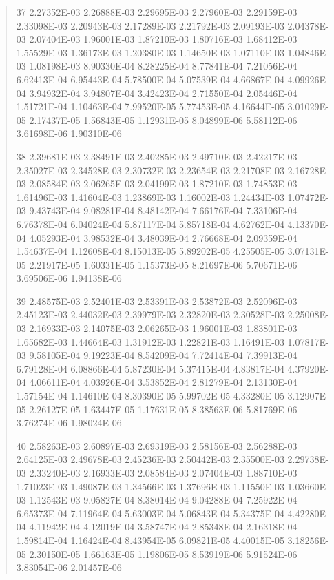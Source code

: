 \documentclass[letterpaper,10pt,english]{sphinxmanual}
\begin{document}
\begin{quote}
\begin{DUlineblock}{0em}
\item[] 37   2.27352E-03  2.26888E-03  2.29695E-03  2.27960E-03  2.29159E-03  2.33098E-03  2.20943E-03  2.17289E-03  2.21792E-03  2.09193E-03  2.04378E-03  2.07404E-03  1.96001E-03  1.87210E-03  1.80716E-03  1.68412E-03  1.55529E-03  1.36173E-03  1.20380E-03  1.14650E-03  1.07110E-03  1.04846E-03  1.08198E-03  8.90330E-04  8.28225E-04  8.77841E-04  7.21056E-04  6.62413E-04  6.95443E-04  5.78500E-04  5.07539E-04  4.66867E-04  4.09926E-04  3.94932E-04  3.94807E-04  3.42423E-04  2.71550E-04  2.05446E-04  1.51721E-04  1.10463E-04  7.99520E-05  5.77453E-05  4.16644E-05  3.01029E-05  2.17437E-05  1.56843E-05  1.12931E-05  8.04899E-06  5.58112E-06  3.61698E-06  1.90310E-06
\item[] 38   2.39681E-03  2.38491E-03  2.40285E-03  2.49710E-03  2.42217E-03  2.35027E-03  2.34528E-03  2.30732E-03  2.23654E-03  2.21708E-03  2.16728E-03  2.08584E-03  2.06265E-03  2.04199E-03  1.87210E-03  1.74853E-03  1.61496E-03  1.41604E-03  1.23869E-03  1.16002E-03  1.24434E-03  1.07472E-03  9.43743E-04  9.08281E-04  8.48142E-04  7.66176E-04  7.33106E-04  6.76378E-04  6.04024E-04  5.87117E-04  5.85718E-04  4.62762E-04  4.13370E-04  4.05293E-04  3.98532E-04  3.48039E-04  2.76668E-04  2.09359E-04  1.54637E-04  1.12608E-04  8.15013E-05  5.89202E-05  4.25505E-05  3.07131E-05  2.21917E-05  1.60331E-05  1.15373E-05  8.21697E-06  5.70671E-06  3.69506E-06  1.94138E-06
\item[] 39   2.48575E-03  2.52401E-03  2.53391E-03  2.53872E-03  2.52096E-03  2.45123E-03  2.44032E-03  2.39979E-03  2.32820E-03  2.30528E-03  2.25008E-03  2.16933E-03  2.14075E-03  2.06265E-03  1.96001E-03  1.83801E-03  1.65682E-03  1.44664E-03  1.31912E-03  1.22821E-03  1.16491E-03  1.07817E-03  9.58105E-04  9.19223E-04  8.54209E-04  7.72414E-04  7.39913E-04  6.79128E-04  6.08866E-04  5.87230E-04  5.37415E-04  4.83817E-04  4.37920E-04  4.06611E-04  4.03926E-04  3.53852E-04  2.81279E-04  2.13130E-04  1.57154E-04  1.14610E-04  8.30390E-05  5.99702E-05  4.33280E-05  3.12907E-05  2.26127E-05  1.63447E-05  1.17631E-05  8.38563E-06  5.81769E-06  3.76274E-06  1.98024E-06
\item[] 40   2.58263E-03  2.60897E-03  2.69319E-03  2.58156E-03  2.56288E-03  2.64125E-03  2.49678E-03  2.45236E-03  2.50442E-03  2.35500E-03  2.29738E-03  2.33240E-03  2.16933E-03  2.08584E-03  2.07404E-03  1.88710E-03  1.71023E-03  1.49087E-03  1.34566E-03  1.37696E-03  1.11550E-03  1.03660E-03  1.12543E-03  9.05827E-04  8.38014E-04  9.04288E-04  7.25922E-04  6.65373E-04  7.11964E-04  5.63003E-04  5.06843E-04  5.34375E-04  4.42280E-04  4.11942E-04  4.12019E-04  3.58747E-04  2.85348E-04  2.16318E-04  1.59814E-04  1.16424E-04  8.43954E-05  6.09821E-05  4.40015E-05  3.18256E-05  2.30150E-05  1.66163E-05  1.19806E-05  8.53919E-06  5.91524E-06  3.83054E-06  2.01457E-06

\end{DUlineblock}
\end{quote}
\end{document}

